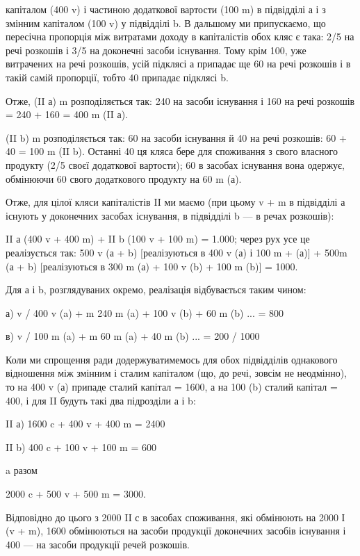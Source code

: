 \parcont{}  %
капіталом (400 v) і частиною додаткової вартости (100 m) в підвідділі а
і з змінним капіталом (100 v) у підвідділі b. В дальшому ми припускаємо,
що пересічна пропорція між витратами доходу в капіталістів обох кляс
є така: 2/5 на речі розкошів і 3/5 на доконечні засоби існування.
Тому крім 100, уже витрачених на речі розкошів, усій підклясі а припадає
ще 60 на речі розкошів і в такій самій пропорції, тобто 40 припадає
підклясі b.

Отже, (II а) m розподіляється так: 240 на засоби існування і 160 на
речі розкошів = 240 + 160 = 400 m (II а).

(II b) m розподіляється так: 60 на засоби існування й 40 на речі
розкошів: 60 + 40 = 100 m (II b). Останні 40 ця кляса бере для споживання
з свого власного продукту (2/5 своєї додаткової вартости); 60 в
засобах існування вона одержує, обмінюючи 60 свого додаткового продукту
на 60 m (а).

Отже, для цілої кляси капіталістів II ми маємо (при цьому v + m в
підвідділі а існують у доконечних засобах існування, в підвідділі b — в
речах розкошів):

II а (400 v + 400 m) + II b (100 v + 100 m) = 1.000; через рух усе
це реалізується так: 500 v (а + b) [реалізуються в 400 v (а) і 100 m + (а)] +
500m (а + b) [реалізуються в 300 m (а) + 100 v (b) + 100 m (b)] =
1000.

Для а і b, розглядуваних окремо, реалізація відбувається таким
чином:

а) v / 400 v (a) + m 240 m (a) + 100 v (b) + 60 m (b) ... = 800

в) v / 100 m (a) + m 60 m (a) + 40 m (b) ... = 200 / 1000

Коли ми спрощення ради додержуватимемось для обох підвідділів однакового
відношення між змінним і сталим капіталом (що, до речі, зовсім не неодмінно),
то на 400 v (а) припаде сталий капітал = 1600, а на 100 (b)
сталий капітал = 400, і для II будуть такі два підрозділи а і b:

II а) 1600 c + 400 v + 400 m = 2400

II b) 400 c + 100 v + 100 m = 600

a разом

2000 c + 500 v + 500 m = 3000.

Відповідно до цього з 2000 II с в засобах споживання, які обмінюють
на 2000 І (v + m), 1600 обмінюються на засоби продукції доконечних
засобів існування і 400 — на засоби продукції речей розкошів.

